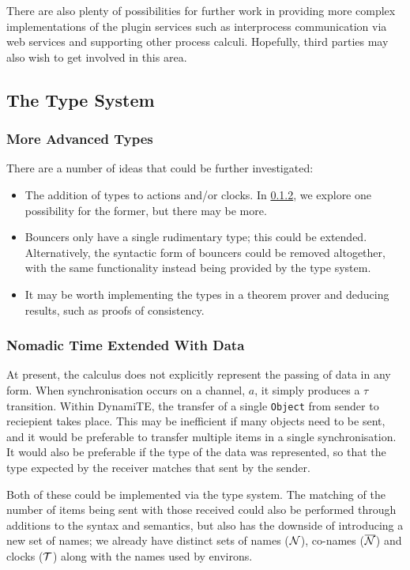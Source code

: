 There are also plenty of possibilities for further work in providing
more complex implementations of the plugin services such as
interprocess communication via web services and supporting other
process calculi.  Hopefully, third parties may also wish to get
involved in this area.

\subsection{The Type System}
\label{future:types}

\subsubsection{More Advanced Types}

There are a number of ideas that could be further investigated:

\begin{itemize}
\item The addition of types to actions and/or clocks.  In \ref{tnted},
  we explore one possibility for the former, but there may be more.
\item Bouncers only have a single rudimentary type; this could be
  extended.  Alternatively, the syntactic form of bouncers could be
  removed altogether, with the same functionality instead being
  provided by the type system.
\item It may be worth implementing the types in a theorem prover and
  deducing results, such as proofs of consistency.
\end{itemize}

\subsubsection{Nomadic Time Extended With Data}
\label{tnted}

At present, the calculus does not explicitly represent the passing of
data in any form.  When synchronisation occurs on a channel, $a$, it
simply produces a $\tau$ transition.  Within DynamiTE, the transfer of
a single \texttt{Object} from sender to reciepient takes place.  This
may be inefficient if many objects need to be sent, and it would be
preferable to transfer multiple items in a single synchronisation.  It
would also be preferable if the type of the data was represented, so
that the type expected by the receiver matches that sent by the
sender.

Both of these could be implemented via the type system.  The matching
of the number of items being sent with those received could also be
performed through additions to the syntax and semantics, but also has
the downside of introducing a new set of names; we already have
distinct sets of names ($\text{$\mathcal{N}$}$), co-names ($\text{$\overline{\text{$\mathcal{N}$}}$}$) and clocks
($\text{$\mathcal{T}$}$) along with the names used by environs.

